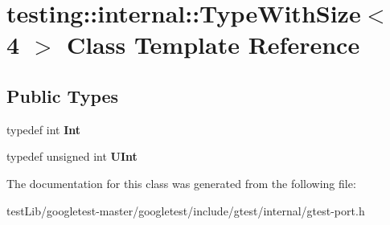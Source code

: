 \hypertarget{classtesting_1_1internal_1_1TypeWithSize_3_014_01_4}{}\section{testing\+:\+:internal\+:\+:Type\+With\+Size$<$ 4 $>$ Class Template Reference}
\label{classtesting_1_1internal_1_1TypeWithSize_3_014_01_4}
\subsection*{Public Types}
\begin{DoxyCompactItemize}
\item 
\mbox{\label{classtesting_1_1internal_1_1TypeWithSize_3_014_01_4_a80351860c00ed665e73f952143f4484a}} 
typedef int {\bfseries Int}
\item 
\mbox{\label{classtesting_1_1internal_1_1TypeWithSize_3_014_01_4_a7d559570f830bf35d095eeb94d98de58}} 
typedef unsigned int {\bfseries U\+Int}
\end{DoxyCompactItemize}


The documentation for this class was generated from the following file\+:\begin{DoxyCompactItemize}
\item 
test\+Lib/googletest-\/master/googletest/include/gtest/internal/gtest-\/port.\+h\end{DoxyCompactItemize}
